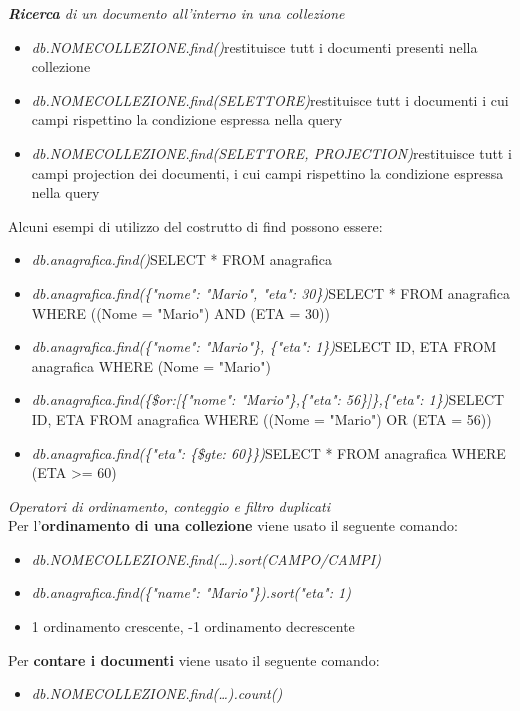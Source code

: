 \documentclass{article}
\begin{document}
\textit{\textbf{Ricerca} di un documento all'interno in una collezione}
\begin{itemize}[label={ }, leftmargin=1cm]
    \itemsep0em
    \item \textit{db.NOMECOLLEZIONE.find()}\quad restituisce tutt i documenti presenti nella collezione
    \item \textit{db.NOMECOLLEZIONE.find(SELETTORE)}\quad restituisce tutt i documenti i cui campi rispettino la condizione espressa nella query
    \item \textit{db.NOMECOLLEZIONE.find(SELETTORE, PROJECTION)}\quad restituisce tutt i campi projection dei documenti, i cui campi rispettino la condizione espressa nella query
\end{itemize}
Alcuni esempi di utilizzo del costrutto di find possono essere:
\begin{itemize}[label={ }, leftmargin=1cm]
    \itemsep0em
    \item \textit{db.anagrafica.find()}\quad SELECT * FROM anagrafica
    \item \textit{db.anagrafica.find(\{"nome": "Mario", "eta": 30\})}\quad SELECT * FROM anagrafica WHERE ((Nome = "Mario") AND (ETA = 30))
    \item \textit{db.anagrafica.find(\{"nome": "Mario"\}, \{"eta": 1\})}\quad SELECT \textunderscore ID, ETA FROM anagrafica WHERE (Nome = "Mario")
    \item \textit{db.anagrafica.find(\{\$or:[\{"nome": "Mario"\},\{"eta": 56\}]\},\{"eta": 1\})}\quad SELECT \textunderscore ID, ETA FROM anagrafica WHERE ((Nome = "Mario") OR (ETA = 56))
    \item \textit{db.anagrafica.find(\{"eta": \{\$gte: 60\}\})}\quad SELECT * FROM anagrafica WHERE (ETA >= 60)
\end{itemize}
\textit{Operatori di ordinamento, conteggio e filtro duplicati}\\
Per l'\textbf{ordinamento di una collezione} viene usato il seguente comando:
\begin{itemize}[label={ }, leftmargin=1cm]
    \itemsep0em
    \item \textit{db.NOMECOLLEZIONE.find(\dots).sort(CAMPO/CAMPI)}
    \item \textit{db.anagrafica.find(\{"name": "Mario"\}).sort("eta": 1)}
    \item 1 ordinamento crescente, -1 ordinamento decrescente
\end{itemize}
Per \textbf{contare i documenti} viene usato il seguente comando:
\begin{itemize}[label={ }, leftmargin=1cm]
    \itemsep0em
    \item \textit{db.NOMECOLLEZIONE.find(\dots).count()}
\end{itemize}
\end{document}
